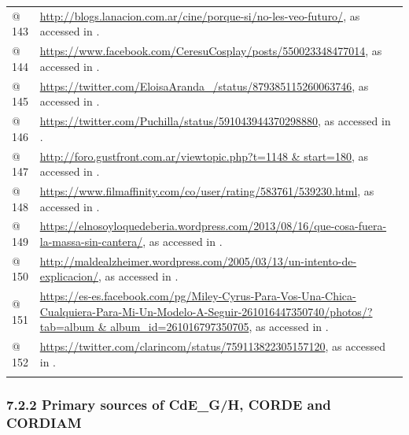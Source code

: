 \documentclass[output=paper]{langscibook}
\begin{document}
\begin{tabularx}{\textwidth}{XX}
@ 143 & \url{http://blogs.lanacion.com.ar/cine/porque-si/no-les-veo-futuro/}, as accessed in \citealt{November2020}.\\
@ 144 & \url{https://www.facebook.com/CeresuCosplay/posts/550023348477014}, as accessed in \citealt{November2020}.\\
@ 145 & \url{https://twitter.com/EloisaAranda_/status/879385115260063746}, as accessed in \citealt{November2020}.\\
@ 146 & \url{https://twitter.com/Puchilla/status/591043944370298880}, as accessed in \citealt{November2020}.\\
@ 147 & \url{http://foro.gustfront.com.ar/viewtopic.php?t=1148 & start=180}, as accessed in \citealt{November2020}.\\
@ 148 & \url{https://www.filmaffinity.com/co/user/rating/583761/539230.html}, as accessed in \citealt{November2020}.\\
@ 149 & \url{https://elnosoyloquedeberia.wordpress.com/2013/08/16/que-cosa-fuera-la-massa-sin-cantera/}, as accessed in \citealt{November2020}.\\
@ 150 & \url{http://maldealzheimer.wordpress.com/2005/03/13/un-intento-de-explicacion/}, as accessed in \citealt{November2020}.\\
@ 151 & \url{https://es-es.facebook.com/pg/Miley-Cyrus-Para-Vos-Una-Chica-Cualquiera-Para-Mi-Un-Modelo-A-Seguir-261016447350740/photos/?tab=album & album_id=261016797350705}, as accessed in \citealt{June2021}.\\
@ 152 & \url{https://twitter.com/clarincom/status/759113822305157120}, as accessed in \citealt{June2021}.\\
\lspbottomrule
\end{tabularx}
\subsubsection{7.2.2 Primary sources of CdE\_G/H, CORDE and CORDIAM}
\end{document}
